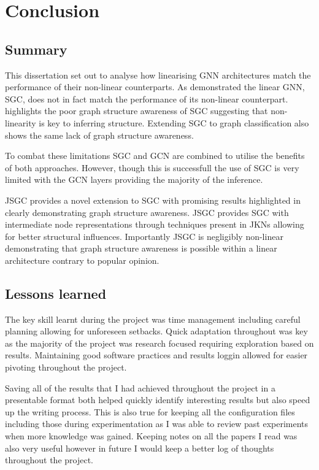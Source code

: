\chapter{Conclusion}

\section{Summary}
This dissertation set out to analyse how linearising GNN architectures match the performance of their non-linear counterparts.
As  demonstrated the linear GNN, SGC, does not in fact match the performance of its non-linear counterpart.
 highlights the poor graph structure awareness of SGC suggesting that non-linearity is key to inferring structure.
Extending SGC to graph classification also shows the same lack of graph structure awareness.

To combat these limitations SGC and GCN are combined to utilise the benefits of both approaches.
However, though this is successfull the use of SGC is very limited with the GCN layers providing the majority of the inference.

JSGC provides a novel extension to SGC with promising results highlighted in  clearly demonstrating graph structure awareness.
JSGC provides SGC with intermediate node representations through techniques present in JKNs\cite{xu2018representation} allowing for better structural influences.
Importantly JSGC is negligibly non-linear demonstrating that graph structure awareness is possible within a linear architecture contrary to popular opinion.

\section{Lessons learned}
The key skill learnt during the project was time management including careful planning allowing for unforeseen setbacks.
Quick adaptation throughout was key as the majority of the project was research focused requiring exploration based on results.
Maintaining good software practices and results loggin allowed for easier pivoting throughout the project.

Saving all of the results that I had achieved throughout the project in a presentable format both helped quickly identify interesting results but also speed up the writing process.
This is also true for keeping all the configuration files including those during experimentation as I was able to review past experiments when more knowledge was gained.
Keeping notes on all the papers I read was also very useful however in future I would keep a better log of thoughts throughout the project.


